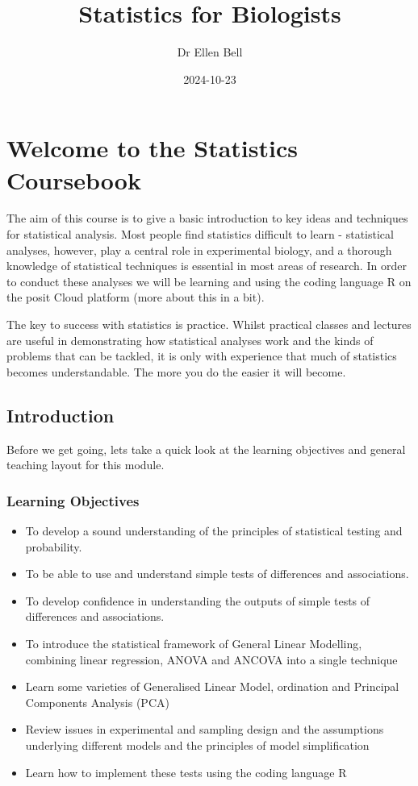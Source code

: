 \documentclass[
]{book}
\title{Statistics for Biologists}
\author{Dr Ellen Bell}
\date{2024-10-23}
\providecommand{\tightlist}{%
  \setlength{\itemsep}{0pt}\setlength{\parskip}{0pt}}
\begin{document}
\maketitle

{
\setcounter{tocdepth}{1}
\tableofcontents
}
\chapter{Welcome to the Statistics Coursebook}\label{c1}

The aim of this course is to give a basic introduction to key ideas and techniques for statistical analysis. Most people find statistics difficult to learn - statistical analyses, however, play a central role in experimental biology, and a thorough knowledge of statistical techniques is essential in most areas of research. In order to conduct these analyses we will be learning and using the coding language R on the posit Cloud platform (more about this in a bit).

The key to success with statistics is practice. Whilst practical classes and lectures are useful in demonstrating how statistical analyses work and the kinds of problems that can be tackled, it is only with experience that much of statistics becomes understandable. The more you do the easier it will become.

\section{Introduction}\label{introduction}

Before we get going, lets take a quick look at the learning objectives and general teaching layout for this module.

\subsection{Learning Objectives}\label{learning-objectives}

\begin{itemize}
\tightlist
\item
  To develop a sound understanding of the principles of statistical testing and probability.
\item
  To be able to use and understand simple tests of differences and associations.
\item
  To develop confidence in understanding the outputs of simple tests of differences and associations.
\item
  To introduce the statistical framework of General Linear Modelling, combining linear regression, ANOVA and ANCOVA into a single technique
\item
  Learn some varieties of Generalised Linear Model, ordination and Principal Components Analysis (PCA)
\item
  Review issues in experimental and sampling design and the assumptions underlying different models and the principles of model simplification
\item
  Learn how to implement these tests using the coding language R
\end{itemize}
\end{document}
